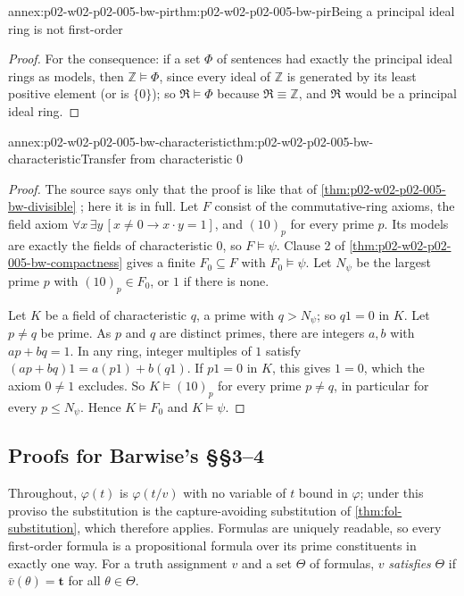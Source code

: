 \begin{annexitem}{annex:p02-w02-p02-005-bw-pir}{thm:p02-w02-p02-005-bw-pir}{Being a principal ideal ring is not first-order}
\begin{proof}
For the consequence: if a set \(\Phi\) of sentences had exactly the
principal ideal rings as models, then \(\mathbb Z\models\Phi\), since
every ideal of \(\mathbb Z\) is generated by its least positive element (or
is \(\{0\}\)); so \(\mathfrak R\models\Phi\) because
\(\mathfrak R\equiv\mathbb Z\), and \(\mathfrak R\) would be a principal
ideal ring.
\end{proof}
\end{annexitem}

\begin{annexitem}{annex:p02-w02-p02-005-bw-characteristic}{thm:p02-w02-p02-005-bw-characteristic}{Transfer from characteristic \(0\)}
\begin{proof}
The source says only that the proof is like that of
\cref{thm:p02-w02-p02-005-bw-divisible}
\cite[ch.~A.1, \S2, p.~15]{Barwise1977FirstOrder}; here it is in full.
Let \(F\) consist of the commutative-ring axioms, the field axiom
\(\forall x\,\exists y\,[x\neq0\to x\cdot y=1]\), and \((10)_p\) for every
prime \(p\).  Its models are exactly the fields of characteristic \(0\), so
\(F\models\psi\).  Clause 2 of \cref{thm:p02-w02-p02-005-bw-compactness}
gives a finite \(F_0\subseteq F\) with \(F_0\models\psi\).  Let
\(N_\psi\) be the largest prime \(p\) with \((10)_p\in F_0\), or \(1\) if
there is none.

Let \(K\) be a field of characteristic \(q\), a prime with \(q>N_\psi\);
so \(q1=0\) in \(K\).  Let \(p\neq q\) be prime.  As \(p\) and \(q\) are
distinct primes, there are integers \(a,b\) with \(ap+bq=1\).  In any ring,
integer multiples of \(1\) satisfy \((ap+bq)1=a(p1)+b(q1)\).  If \(p1=0\)
in \(K\), this gives \(1=0\), which the axiom \(0\neq1\) excludes.  So
\(K\models(10)_p\) for every prime \(p\neq q\), in particular for every
\(p\leq N_\psi\).  Hence \(K\models F_0\) and \(K\models\psi\).
\end{proof}
\end{annexitem}

\subsection{Proofs for Barwise's \S\S3--4}
\label{sec:annex-p02-w02-p02-005-bw-s4}

Throughout, \(\varphi(t)\) is \(\varphi(t/v)\) with no variable of \(t\)
bound in \(\varphi\); under this proviso the substitution is the
capture-avoiding substitution of \cref{thm:fol-substitution}, which
therefore applies.  Formulas are uniquely readable, so every first-order
formula is a propositional formula over its prime constituents in exactly
one way.  For a truth assignment \(v\) and a set \(\Theta\) of formulas,
\(v\) \emph{satisfies} \(\Theta\) if \(\bar v(\theta)=\mathbf t\) for all
\(\theta\in\Theta\).

